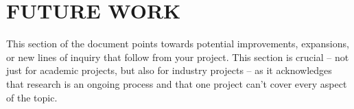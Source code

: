 
\section{FUTURE WORK}
    This section of the document points towards potential improvements, expansions, or new lines of inquiry that follow from your project. This section is crucial – not just for academic projects, but also for industry projects – as it acknowledges that research is an ongoing process and that one project can't cover every aspect of the topic.\\
    \lipsum[4]